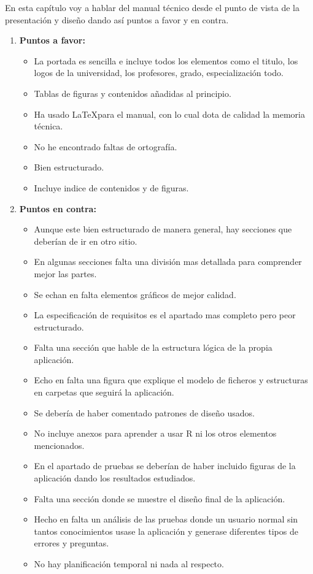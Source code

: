 En esta capítulo voy a hablar del manual técnico desde el punto de vista de la presentación y diseño dando así puntos a favor y en contra.

    \begin{enumerate}
        \item \textbf{Puntos a favor: }
            \begin{itemize}
                \item La portada es sencilla e incluye todos los elementos como el titulo, los logos de la universidad, los profesores, grado, especialización todo.
                \item Tablas de figuras y contenidos añadidas al principio.
                \item Ha usado \LaTeX para el manual, con lo cual dota de calidad la memoria técnica.
                \item No he encontrado faltas de ortografía.
                \item Bien estructurado.
                \item Incluye indice de contenidos y de figuras.
            \end{itemize}
        \item \textbf{Puntos en contra: }
            \begin{itemize}
                \item Aunque este bien estructurado de manera general, hay secciones que deberían de ir en otro sitio.
                \item En algunas secciones falta una división mas detallada para comprender mejor las partes.
                \item Se echan en falta elementos gráficos de mejor calidad.
                \item La especificación de requisitos es el apartado mas completo pero peor estructurado.
                \item Falta una sección que hable de la estructura lógica de la propia aplicación.
                \item Echo en falta una figura que explique el modelo de ficheros y estructuras en carpetas que seguirá la aplicación.
                \item Se debería de haber comentado patrones de diseño usados.
                \item No incluye anexos para aprender a usar R ni los otros elementos mencionados.
                \item En el apartado de pruebas se deberían de haber incluido figuras de la aplicación dando los resultados estudiados.
                \item Falta una sección donde se muestre el diseño final de la aplicación.
                \item Hecho en falta un análisis de las pruebas donde un usuario normal sin tantos conocimientos usase la aplicación y generase diferentes tipos de errores y preguntas.
                \item No hay planificación temporal ni nada al respecto.
            \end{itemize}
    \end{enumerate}


